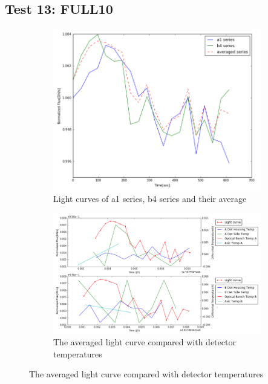 \documentclass{aastex6}
\begin{document}
\subsection{Test 13: FULL10} 
\begin{figure}[H]
    \centering
    \begin{subfigure}{1}
        \includegraphics[scale=0.4]{ts_test13}
        \caption{Light curves of a1 series, b4 series and their average}
    \end{subfigure}

    \begin{subfigure}{2}
        \includegraphics[scale=0.4]{temp_test13}
        \caption{The averaged light curve compared with detector temperatures}
    \end{subfigure}
   

\end{figure}
\end{document}
